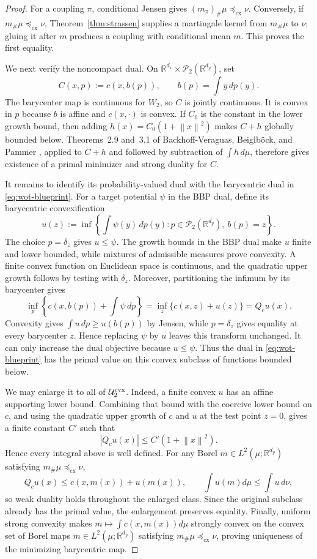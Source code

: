 \documentclass[11pt]{article}
\newcommand{\R}{\mathbb R}
\newcommand{\cP}{\mathcal P}
\newcommand{\norm}[1]{\left\lVert #1\right\rVert}
\newcommand{\cx}{\preceq_{\mathrm{cx}}}
\theoremstyle{plain}
\theoremstyle{definition}
\theoremstyle{remark}
\begin{document}
\begin{proof}
For a coupling $\pi$, conditional Jensen gives
$(m_\pi)_\#\mu\cx\nu$. Conversely, if $m_\#\mu\cx\nu$,
Theorem~\ref{thm:strassen} supplies a martingale kernel from $m_\#\mu$ to $\nu$;
gluing it after $m$ produces a coupling with conditional mean $m$. This proves the
first equality.

We next verify the noncompact dual. On
$\R^{d_x}\times\cP_2(\R^{d_y})$, set
\[
 C(x,p):=c(x,b(p)),\qquad b(p)=\int y\,dp(y).
\]
The barycenter map is continuous for $W_2$, so $C$ is jointly continuous. It is
convex in $p$ because $b$ is affine and $c(x,\cdot)$ is convex. If $C_0$ is the
constant in the lower growth bound, then adding
$h(x)=C_0(1+\norm x^2)$ makes $C+h$ globally bounded below.
Theorems~2.9 and~3.1 of Backhoff-Veraguas, Beiglb\"ock, and Pammer
\cite{BBP}, applied to $C+h$ and followed by subtraction of $\int h\,d\mu$,
therefore gives existence of a primal minimizer and strong duality for $C$.

It remains to identify its probability-valued dual with the barycentric dual in
\eqref{eq:wot-blueprint}. For a target potential $\psi$ in the BBP dual, define its barycentric
convexification
\[
 u(z):=\inf\left\{\int\psi(y)\,dp(y):
 p\in\cP_2(\R^{d_y}),\ b(p)=z\right\}.
\]
The choice $p=\delta_z$ gives $u\le\psi$. The growth bounds in the BBP dual make
$u$ finite and lower bounded, while mixtures of admissible measures prove convexity.
A finite convex function on Euclidean space is continuous, and the quadratic upper
growth follows by testing with $\delta_z$. Moreover, partitioning the infimum by its
barycenter gives
\[
 \inf_p\left\{c(x,b(p))+\int\psi\,dp\right\}
 =\inf_z\{c(x,z)+u(z)\}=Q_cu(x).
\]
Convexity gives $\int u\,dp\ge u(b(p))$ by Jensen, while $p=\delta_z$ gives
equality at every barycenter $z$. Hence replacing $\psi$ by $u$ leaves this
transform unchanged. It can only increase the dual objective because $u\le\psi$.
Thus the dual in \eqref{eq:wot-blueprint} has the primal value on this convex subclass of functions
bounded below.

We may enlarge it to all of $\mathcal U_2^{\rm cvx}$. Indeed, a finite convex
$u$ has an affine supporting lower bound. Combining that bound with the coercive
lower bound on $c$, and using the quadratic upper growth of $c$ and $u$ at the
test point $z=0$, gives a finite constant $C'$ such that
\[
 |Q_cu(x)|\le C'(1+\norm x^2).
\]
Hence every integral above is well defined. For any Borel
$m\in L^2(\mu;\R^{d_y})$ satisfying $m_\#\mu\cx\nu$,
\[
 Q_cu(x)\le c(x,m(x))+u(m(x)),\qquad
 \int u(m)d\mu\le\int u\,d\nu,
\]
so weak duality holds throughout the enlarged class. Since the original subclass
already has the primal value, the enlargement preserves equality. Finally, uniform
strong convexity makes $m\mapsto\int c(x,m(x))d\mu$ strongly convex on the
convex set of Borel maps $m\in L^2(\mu;\R^{d_y})$ satisfying
$m_\#\mu\cx\nu$, proving uniqueness of the minimizing barycentric map.
\end{proof}
\end{document}
